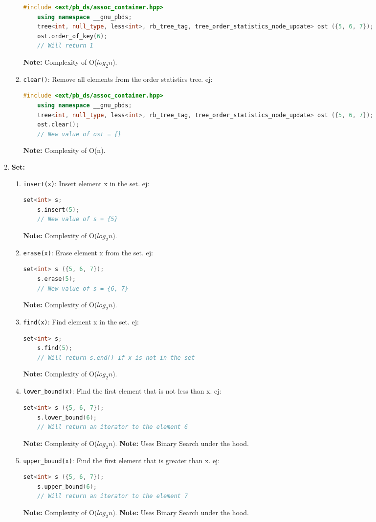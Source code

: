 \begin{enumerate}
\begin{enumerate}
	\begin{lstlisting}[language=C++]
	#include <ext/pb_ds/assoc_container.hpp>
	using namespace __gnu_pbds;
	tree<int, null_type, less<int>, rb_tree_tag, tree_order_statistics_node_update> ost ({5, 6, 7});
	ost.order_of_key(6);
	// Will return 1
	\end{lstlisting}
	\textbf{Note:} Complexity of O($log_2n$).
      \item \texttt{clear()}: Remove all elements from the order statistics tree. ej:
	\begin{lstlisting}[language=C++]
	#include <ext/pb_ds/assoc_container.hpp>
	using namespace __gnu_pbds;
	tree<int, null_type, less<int>, rb_tree_tag, tree_order_statistics_node_update> ost ({5, 6, 7});
	ost.clear();
	// New value of ost = {}
	\end{lstlisting}
	\textbf{Note:} Complexity of O(n).
    \end{enumerate}
  \item \textbf{Set:}
    \begin{enumerate}
      \item \texttt{insert(x)}: Insert element x in the set. ej:
	\begin{lstlisting}[language=C++]
	set<int> s;
	s.insert(5);
	// New value of s = {5}
	\end{lstlisting}
	\textbf{Note:} Complexity of O($log_2n$).
      \item \texttt{erase(x)}: Erase element x from the set. ej:
	\begin{lstlisting}[language=C++]
	set<int> s ({5, 6, 7});
	s.erase(5);
	// New value of s = {6, 7}
	\end{lstlisting}
	\textbf{Note:} Complexity of O($log_2n$).
      \item \texttt{find(x)}: Find element x in the set. ej:
	\begin{lstlisting}[language=C++]
	set<int> s;
	s.find(5);
	// Will return s.end() if x is not in the set
	\end{lstlisting}
	\textbf{Note:} Complexity of O($log_2n$).
      \item \texttt{lower\_bound(x)}: Find the first element that is not less than x. ej:
	\begin{lstlisting}[language=C++]
	set<int> s ({5, 6, 7});
	s.lower_bound(6);
	// Will return an iterator to the element 6
	\end{lstlisting}
	\textbf{Note:} Complexity of O($log_2n$).
	\textbf{Note:} Uses Binary Search under the hood.
      \item \texttt{upper\_bound(x)}: Find the first element that is greater than x. ej:
	\begin{lstlisting}[language=C++]
	set<int> s ({5, 6, 7});
	s.upper_bound(6);
	// Will return an iterator to the element 7
	\end{lstlisting}
	\textbf{Note:} Complexity of O($log_2n$).
	\textbf{Note:} Uses Binary Search under the hood.
    \end{enumerate}
\end{enumerate}
